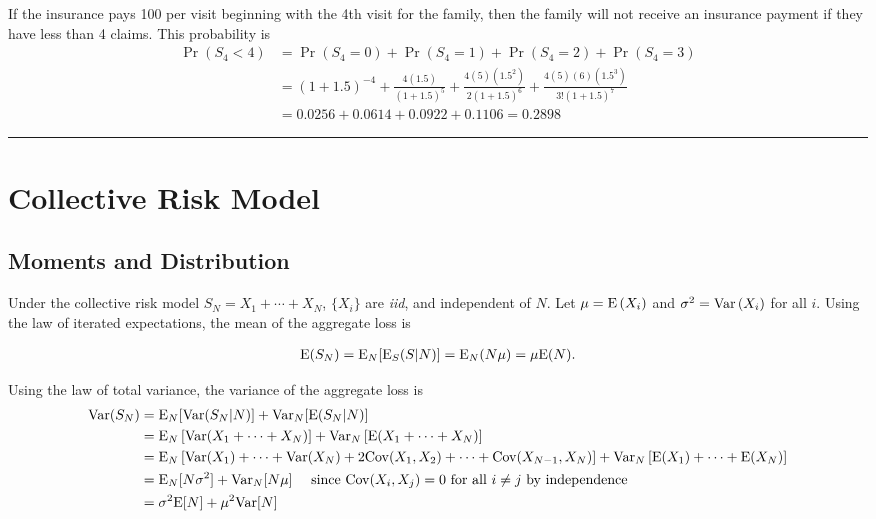 \documentclass[]{book}
\theoremstyle{definition}
\theoremstyle{definition}
\theoremstyle{definition}
\theoremstyle{remark}
\begin{document}
If the insurance pays 100 per visit beginning with the 4th visit for the
family, then the family will not receive an insurance payment if they
have less than 4 claims. This probability is \[\begin{aligned}
    \Pr(S_4 < 4) &= \Pr(S_4 = 0) + \Pr(S_4 = 1) + \Pr(S_4 = 2) +\Pr(S_4 = 3) \\
    &= (1+1.5)^{-4} + \frac{4(1.5)}{(1+1.5)^5} + \frac{4(5)(1.5^2)}{2(1+1.5)^6} + \frac{4(5)(6)(1.5^3)}{3!(1+1.5)^7}\\
    &= 0.0256 + 0.0614 + 0.0922 + 0.1106 = 0.2898
\end{aligned}\]

\begin{center}\rule{0.5\linewidth}{\linethickness}\end{center}

\section{Collective Risk Model}\label{collective-risk-model}

\subsection{Moments and Distribution}\label{moments-and-distribution}

Under the collective risk model \(S_N=X_1+\cdots+X_N\), \(\{X_i\}\) are
\emph{iid}, and independent of \(N\). Let
\(\mu = {\rm E}\left( X_{i}\right)\) and
\(\sigma ^{2} = {\rm Var}\left(X_{i}\right)\) for all \(i\). Using the
law of iterated expectations, the mean of the aggregate loss is

\begin{eqnarray*}
{\rm E}(S_N)={\rm E}_N[{\rm E}_S(S|N)] = {\rm E}_N(N\mu) = \mu {\rm E}(N).
\end{eqnarray*}

Using the law of total variance, the variance of the aggregate loss is
\[\begin{aligned}
{\rm Var}(S_N) &= {\rm E}_N[{\rm Var}(S_N|N)] + {\rm Var}_N[{\rm E}(S_N|N)] \\
&= \mathrm{E}_N \left[ \mathrm{Var}(X_1+\cdots+X_N) \right] + \mathrm{Var}_N\left[ \mathrm{E}(X_1+\cdots+X_N) \right] \\
&= \mathrm{E}_N \left[ \mathrm{Var}(X_1)+\cdots+ \mathrm{Var}(X_N) + 2\mathrm{Cov}(X_1, X_2) + \cdots + \mathrm{Cov}(X_{N-1}, X_N) \right] + \mathrm{Var}_N\left[ \mathrm{E}(X_1) + \cdots + \mathrm{E}(X_N) \right]  \\
&={\rm E}_N[N\sigma^2] + {\rm Var}_N[N\mu] ~~~~ \text{since } \mathrm{Cov}(X_i, X_j)=0 \text{ for all } i\neq j \text{ by independence} \\
&=\sigma^2{\rm E}[N] + \mu^2{\rm Var}[N]
\end{aligned}\]
\end{document}

